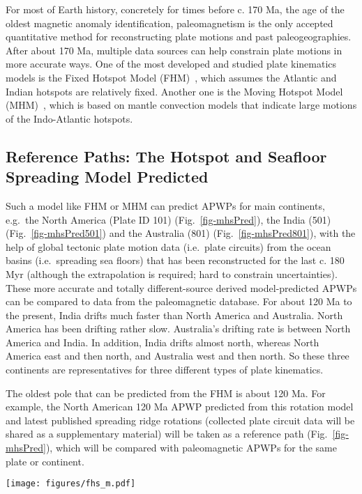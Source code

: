 For most of Earth history, concretely for times before c. 170 Ma, the age of the
oldest magnetic anomaly identification, paleomagnetism is the only accepted
quantitative method for reconstructing plate motions and past paleogeographies.
After about 170 Ma, multiple data sources can help constrain plate motions in
more accurate ways. One of the most developed and studied plate kinematics
models is the Fixed Hotspot Model (FHM)~\cite{M93,M99}, which assumes the
Atlantic and Indian hotspots are relatively fixed. Another one is the Moving
Hotspot Model (MHM)~\cite{O05}, which is based on mantle convection models that
indicate large motions of the Indo-Atlantic hotspots.

\subsection{Reference Paths: The Hotspot and Seafloor Spreading Model Predicted}

Such a model like FHM or MHM can predict APWPs for main continents, e.g.\ the
North America (Plate ID 101) (Fig.~\ref{fig-mhsPred}), the India (501)
(Fig.~\ref{fig-mhsPred501}) and the Australia (801) (Fig.~\ref{fig-mhsPred801}),
with the help of global tectonic plate motion
data (i.e.\ plate circuits) from the ocean basins (i.e.\ spreading sea floors)
that has been reconstructed for the last c. 180 Myr (although the
extrapolation is required; hard to constrain uncertainties). These more accurate
and totally different-source derived model-predicted APWPs can be compared to
data from the paleomagnetic database. For about 120 Ma to the present, India
drifts much faster than North America and Australia. North America has been
drifting rather slow. Australia's drifting rate is between North America and
India. In addition, India drifts almost north, whereas North America east and
then north, and Australia west and then north. So these three continents are
representatives for three different types of plate kinematics.

The oldest pole that can be predicted from the FHM is about 120 Ma. For example,
the North American 120 Ma APWP predicted from this rotation model
and latest published spreading ridge rotations (collected plate circuit data
will be shared as a supplementary material) will be taken as a reference path
(Fig.~\ref{fig-mhsPred}), which will be compared with paleomagnetic APWPs for
the same plate or continent.

\begin{figure*}
\centering
\texttt{[image: figures/fhs\_m.pdf]}
\caption[120 Ma MHM vs FHM predicted APWP of North America]{MHM
predicted 120 Ma APWP (solid line) for $NAC$ through the North
America\textendash{}Nubia\textendash{}Mantle plate circuit. Its age step is 5
Myr. The dashed line is the FHM predicted path for comparison.}\label{fig-mhsPred}
\end{figure*}

